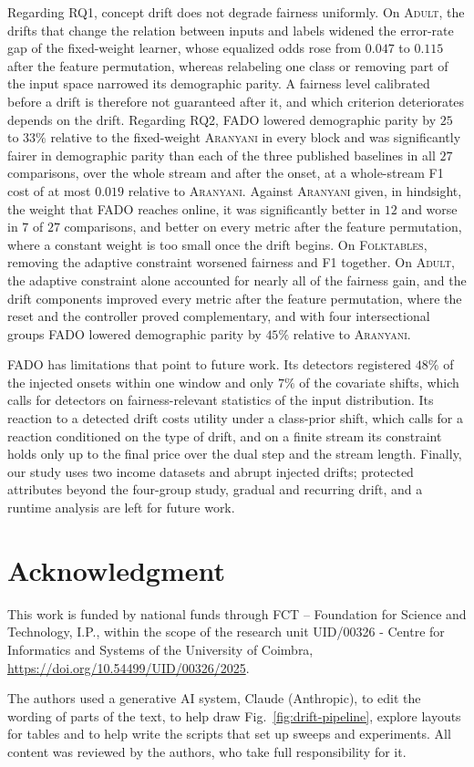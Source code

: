 \documentclass[conference]{IEEEtran}
\newcommand{\fado}{\textsc{FADO}}
\newcommand{\ara}{\textsc{Aranyani}}
\newcommand{\adult}{\textsc{Adult}}
\newcommand{\folk}{\textsc{Folktables}}
\newcommand{\rev}[1]{{\color{blue}#1}}
\renewcommand{\rev}[1]{#1}
\begin{document}
Regarding RQ1, concept drift does not degrade fairness uniformly. On \adult{}, the drifts that change the relation between inputs and labels widened the
error-rate gap of the fixed-weight learner, whose equalized odds rose from $0.047$ to $0.115$ after the feature permutation, whereas relabeling one class or
removing part of the input space narrowed its demographic parity. A fairness level calibrated before a drift is therefore not guaranteed after it, and which
criterion deteriorates depends on the drift. Regarding RQ2, \fado{} lowered demographic parity by $25$ to $33\%$ relative to the fixed-weight \ara{} in every block
and was significantly fairer in demographic parity than each of the three published baselines in all $27$ comparisons, over the whole stream and after the
onset, at a whole-stream F1 cost of at most $0.019$ relative to \ara{}. Against \ara{} given, in hindsight, the weight that \fado{} reaches
online, it was significantly better in $12$ and worse in $7$ of $27$ comparisons, and better on every metric after the feature permutation, where a constant
weight is too small once the drift begins. On \folk{}, removing the adaptive constraint worsened fairness and F1 together. \rev{On \adult{}, the adaptive constraint
alone accounted for nearly all of the fairness gain, and the drift components improved every metric after the feature permutation, where the reset and
the controller proved complementary, and with four intersectional groups
\fado{} lowered demographic parity by $45\%$ relative to \ara{}.}

\fado{} has limitations that point to future work. Its detectors registered $48\%$ of the injected onsets within one window
and only $7\%$ of the covariate shifts, which calls for detectors on fairness-relevant statistics of the input distribution. \rev{Its reaction to a detected
drift costs utility under a class-prior shift, which calls for a reaction conditioned on the type of drift, and on a finite stream its constraint holds only up to
the final price over the dual step and the stream length.} Finally, our study uses two income datasets and abrupt injected drifts; \rev{protected attributes
beyond the four-group study}, gradual and recurring drift, and a runtime analysis are left for future work.

\section*{Acknowledgment}
This work is funded by national funds through FCT -- Foundation for Science and Technology, I.P., within the scope of the research unit UID/00326 -
Centre for Informatics and Systems of the University of Coimbra, \url{https://doi.org/10.54499/UID/00326/2025}.

The authors used a generative AI system, Claude (Anthropic), to edit the wording of parts of the text, to help draw Fig.~\ref{fig:drift-pipeline}, 
explore layouts for tables and to help write the scripts that set up sweeps and experiments. All content was reviewed by the authors, who take full responsibility for it.




\end{document}
